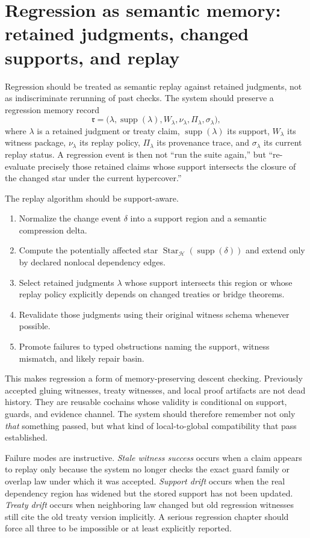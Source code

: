 \documentclass[11pt]{report}
\begin{document}
\section{Regression as semantic memory: retained judgments, changed supports, and replay}
Regression should be treated as semantic replay against retained judgments, not as indiscriminate rerunning of past checks. The system should preserve a regression memory record
\[
\mathfrak{r}
=
\bigl(
\lambda,
\operatorname{supp}(\lambda),
W_\lambda,
\nu_\lambda,
\Pi_\lambda,
\sigma_\lambda
\bigr),
\]
where $\lambda$ is a retained judgment or treaty claim, $\operatorname{supp}(\lambda)$ its support, $W_\lambda$ its witness package, $\nu_\lambda$ its replay policy, $\Pi_\lambda$ its provenance trace, and $\sigma_\lambda$ its current replay status. A regression event is then not ``run the suite again,'' but ``re-evaluate precisely those retained claims whose support intersects the closure of the changed star under the current hypercover.''

The replay algorithm should be support-aware.
\begin{enumerate}
\item Normalize the change event $\delta$ into a support region and a semantic compression delta.
\item Compute the potentially affected star $\operatorname{Star}_{\mathcal{H}}(\operatorname{supp}(\delta))$ and extend only by declared nonlocal dependency edges.
\item Select retained judgments $\lambda$ whose support intersects this region or whose replay policy explicitly depends on changed treaties or bridge theorems.
\item Revalidate those judgments using their original witness schema whenever possible.
\item Promote failures to typed obstructions naming the support, witness mismatch, and likely repair basin.
\end{enumerate}

This makes regression a form of memory-preserving descent checking. Previously accepted gluing witnesses, treaty witnesses, and local proof artifacts are not dead history. They are reusable cochains whose validity is conditional on support, guards, and evidence channel. The system should therefore remember not only \emph{that} something passed, but what kind of local-to-global compatibility that pass established.

Failure modes are instructive. \emph{Stale witness success} occurs when a claim appears to replay only because the system no longer checks the exact guard family or overlap law under which it was accepted. \emph{Support drift} occurs when the real dependency region has widened but the stored support has not been updated. \emph{Treaty drift} occurs when neighboring law changed but old regression witnesses still cite the old treaty version implicitly. A serious regression chapter should force all three to be impossible or at least explicitly reported.
\end{document}
